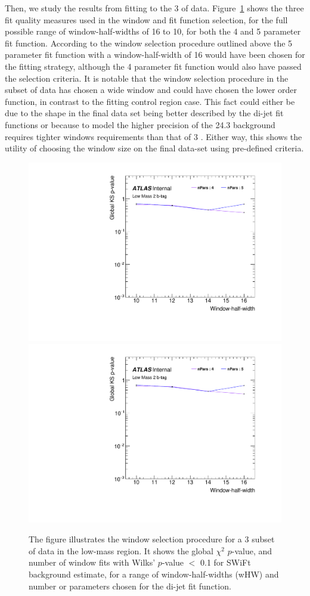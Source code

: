 Then, we study the results from fitting to the 3 \ifb{}  of data.
Figure~\ref{fig:windowSel_subset} shows the three fit quality measures used in the window and fit function selection,
for the full possible range of window-half-widths of 16 to 10, for both the 4 and 5 parameter fit function.
According to the window selection procedure outlined above the 5 parameter fit function with a window-half-width of 16 would have been chosen for the fitting strategy,
although the 4 parameter fit function would also have passed the selection criteria.
It is notable that the window selection procedure in the subset of data has chosen a wide window and
could have chosen the lower order function, in contrast to the fitting control region case. 
This fact could either be due to the shape in the final data set being better described by the di-jet fit functions
or because to model the higher precision of the 24.3 \ifb{} background requires tighter windows requirements than that of 3 \ifb{}.
Either way, this shows the utility of choosing the window size on the final data-set using pre-defined criteria. \\

\begin{figure}[!htb]
\captionsetup[subfigure]{aboveskip=0pt,justification=centering}
\centering
{} {
  \includegraphics[width=0.45\linewidth, angle=0,page=2]{figs/Dibjet/LowMass/FitStudy/windowSel_subset.pdf}
}
 {
  \includegraphics[width=0.45\linewidth, angle=0,page=4]{figs/Dibjet/LowMass/FitStudy/windowSel_subset.pdf}
}
\vspace{10pt}
\caption{\label{fig:windowSel_subset}
  The figure illustrates the window selection procedure for a 3\ifb{} subset of data in the low-mass region.
  It shows the global $\chi^{2}$ $p$-value, %
  and number of window fits with Wilks' $p$-value $<$ 0.1 for SWiFt background estimate,
  for a range of window-half-widths (wHW) and number or parameters chosen for the di-jet fit function.
}
\end{figure}

